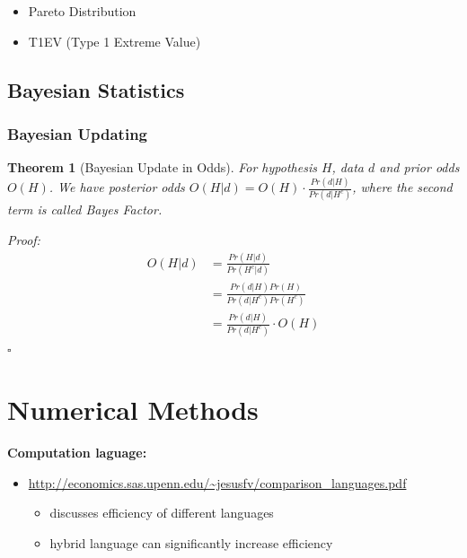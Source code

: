 \documentclass{book}
\theoremstyle{plain}
\newtheorem{thm}{Theorem}[section] %
\theoremstyle{definition}
\newenvironment{myproof}
{\noindent\textit{Proof:}}{\hfill$\square$}
\begin{document}
\begin{itemize}
	\item Pareto Distribution
	\item T1EV (Type 1 Extreme Value)
\end{itemize}





\section{Bayesian Statistics} %
\label{sec:bayesian_statistics}

\subsection{Bayesian Updating} %
\label{sub:bayesian_updating}

\begin{thm}[Bayesian Update in Odds]
For hypothesis $H$, data $d$ and prior odds $O(H)$. We have posterior odds 
$O(H|d) = O(H)\cdot\frac{Pr(d|H)}{Pr(d|H^c)}$,
where the second term is called \textit{Bayes Factor}.
\end{thm}

\begin{myproof}
\begin{align*}
	O(H|d)&=\frac{Pr(H|d)}{Pr(H^c|d)} \\
	&=\frac{Pr(d|H)Pr(H)}{Pr(d|H^c)Pr(H^c)}\\
	&=\frac{Pr(d|H)}{Pr(d|H^c)}\cdot O(H)
\end{align*}
\end{myproof}









\chapter{Numerical Methods} %
\label{cha:numerical_methods}


\noindent
\textbf{Computation laguage:}
\begin{itemize}
	\item \url{http://economics.sas.upenn.edu/~jesusfv/comparison_languages.pdf}
	\begin{itemize}
		\item discusses efficiency of different languages
		\item hybrid language can significantly increase efficiency
	\end{itemize}
\end{itemize}
\end{document}
